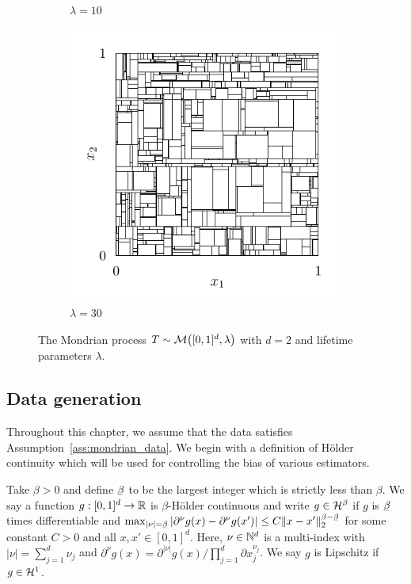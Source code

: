\begin{figure}[ht]
\begin{subfigure}{0.32\textwidth}
    \caption{$\lambda = 10$}
  \end{subfigure}
  \begin{subfigure}{0.32\textwidth}
    \centering
    \includegraphics[scale=0.64]{graphics/plot_mondrian_process_3.pdf}
    \caption{$\lambda = 30$}
  \end{subfigure}
  \caption[The Mondrian process]{
    The Mondrian process $T \sim \mathcal{M} \big( [0,1]^d, \lambda \big)$ with
  $d=2$ and lifetime parameters $\lambda$.}
  \label{fig:mondrian_process}
\end{figure}

\subsection{Data generation}

Throughout this chapter, we assume that the data satisfies
Assumption~\ref{ass:mondrian_data}. We begin with a definition of H{\"o}lder
continuity which will be used for controlling the bias of various estimators.

\begin{definition}%

  Take $\beta > 0$ and define $\flbeta$ to be the largest integer which is
  strictly less than $\beta$. We say a function $g: [0,1]^d \to \mathbb{R}$ is
  $\beta$-H{\"o}lder continuous and write $g \in \mathcal{H}^\beta$ if $g$ is $\flbeta$
  times differentiable and
  $\max_{|\nu| = \flbeta}
  \left| \partial^\nu g(x) - \partial^{\nu} g(x') \right|
  \leq C \|x-x'\|_2^{\beta - \flbeta}$
  for some constant $C > 0$ and all $x, x' \in [0,1]^d$. Here, $\nu \in \mathbb{N}^d$
  is a multi-index with $|\nu| = \sum_{j=1}^d \nu_j$ and
  $\partial^{\nu} g(x) = \partial^{|\nu|} g(x) \big/
  \prod_{j=1}^d \partial x_j^{\nu_j}$. We say $g$ is Lipschitz if $g \in \mathcal{H}^1$.

\end{definition}


